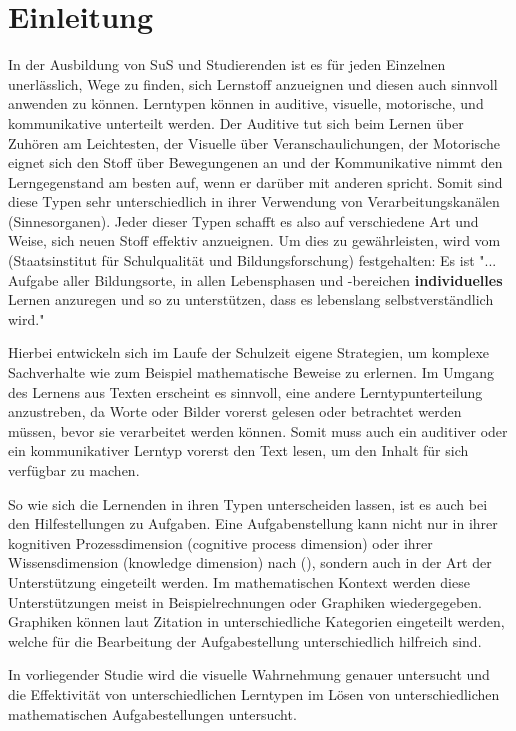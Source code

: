 \chapter{Einleitung}

In der Ausbildung von \gls{SuS} und Studierenden ist es für jeden Einzelnen unerlässlich, Wege zu finden, sich Lernstoff anzueignen und diesen auch sinnvoll anwenden zu können. Lerntypen können in auditive, visuelle, motorische, und kommunikative unterteilt werden. Der Auditive tut sich beim Lernen über Zuhören am Leichtesten, der Visuelle über Veranschaulichungen, der Motorische eignet sich den Stoff über Bewegungenen an und der Kommunikative nimmt den Lerngegenstand am besten auf, wenn er darüber mit anderen spricht.  Somit sind diese Typen sehr unterschiedlich in ihrer Verwendung von Verarbeitungskanälen (Sinnesorganen).
Jeder dieser Typen schafft es also auf verschiedene Art und Weise, sich neuen Stoff effektiv anzueignen.
Um dies zu gewährleisten, wird vom \cite{LehrplanGrundschule} (Staatsinstitut für Schulqualität und Bildungsforschung) festgehalten:
Es ist "... Aufgabe aller Bildungsorte, in allen Lebensphasen und -bereichen \textbf{individuelles}
Lernen anzuregen und so zu unterstützen, dass es lebenslang selbstverständlich wird."

Hierbei entwickeln sich im Laufe der Schulzeit eigene Strategien, um komplexe Sachverhalte
wie zum Beispiel mathematische Beweise zu erlernen. 
Im Umgang des Lernens aus Texten erscheint es sinnvoll, eine andere Lerntypunterteilung anzustreben, da Worte oder Bilder vorerst gelesen oder betrachtet werden müssen, bevor sie verarbeitet werden können. Somit muss auch ein auditiver oder ein kommunikativer Lerntyp vorerst den Text lesen, um den Inhalt für sich verfügbar zu machen. 

So wie sich die Lernenden in ihren Typen unterscheiden lassen, ist es auch bei den Hilfestellungen zu Aufgaben. Eine Aufgabenstellung kann nicht nur in ihrer kognitiven Prozessdimension (cognitive process dimension) oder ihrer Wissensdimension (knowledge dimension) nach \citeauthor{anderson2001taxonomy} (), sondern auch in der Art der Unterstützung eingeteilt werden. Im mathematischen Kontext werden diese Unterstützungen meist in Beispielrechnungen oder Graphiken wiedergegeben. Graphiken können laut Zitation in unterschiedliche Kategorien eingeteilt werden, welche für die Bearbeitung der Aufgabestellung unterschiedlich hilfreich sind. 

In vorliegender Studie wird die visuelle Wahrnehmung genauer untersucht und die Effektivität von unterschiedlichen Lerntypen im Lösen von unterschiedlichen mathematischen Aufgabestellungen untersucht. 